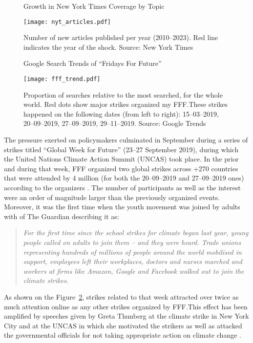 \documentclass[12pt]{article}
\begin{document}
\begin{figure}[t]
    \caption{Growth in New York Times Coverage by Topic}\label{fig:news_trends}
    \texttt{[image: nyt\_articles.pdf]}
    \captionsetup{font=footnotesize}
    \caption*{Number of new articles published per year (2010--2023). Red line indicates the year of the shock. Source: New York Times}
\end{figure}

\begin{figure}[t]
    \caption{Google Search Trends of ``Fridays For Future''}\label{fig:fff_trend}
    \texttt{[image: fff\_trend.pdf]}
    \captionsetup{font=footnotesize}
    \caption*{Proportion of searches relative to the most searched, for the whole world. Red dots show major strikes organized my FFF.\@ These strikes happened on the following dates (from left to right): 15--03--2019, 20--09--2019, 27--09--2019, 29--11--2019. Source: Google Trends}
\end{figure}

The pressure exerted on policymakers culminated in September during a series of strikes titled ``Global Week for Future'' (23--27 September 2019), during which the United Nations Climate Action Summit (UNCAS) took place. In the prior and during that week, FFF organized two global strikes across +270 countries that were attended by 4 million (for both the 20--09--2019 and 27--09--2019 ones) according to the organizers \parencite{fffStrikeStats}. The number of participants as well as the interest were an order of magnitude larger than the previously organized events. Moreover, it was the first time when the youth movement was joined by adults with \citeauthor{watts2019climate} of The Guardian describing it as:

\begin{quote}
    \small
    \textit{For the first time since the school strikes for climate began last year, young people called on adults to join them – and they were heard. Trade unions representing hundreds of millions of people around the world mobilised in support, employees left their workplaces, doctors and nurses marched and workers at firms like Amazon, Google and Facebook walked out to join the climate strikes.} \parencite{watts2019climate}
\end{quote}

As shown on the Figure~\ref{fig:fff_trend}, strikes related to that week attracted over twice as much attention online as any other strikes organized by FFF.\@ This effect has been amplified by speeches given by Greta Thunberg at the climate strike in New York City and at the UNCAS in which she motivated the strikers as well as attacked the governmental officials for not taking appropriate action on climate change \parencite{2019thunberg}.
\end{document}

